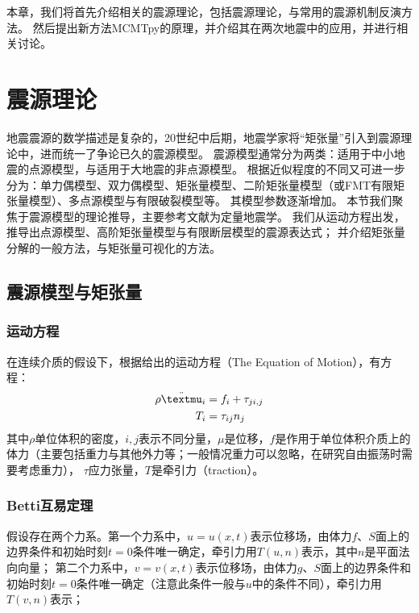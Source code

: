 本章，我们将首先介绍相关的震源理论，包括震源理论，与常用的震源机制反演方法。
然后提出新方法MCMTpy的原理，并介绍其在两次地震中的应用，并进行相关讨论。







\section{震源理论}

地震震源的数学描述是复杂的，20世纪中后期，地震学家将“矩张量”引入到震源理论中，进而统一了争论已久的震源模型。
震源模型通常分为两类：适用于中小地震的点源模型，与适用于大地震的非点源模型。
根据近似程度的不同又可进一步分为：单力偶模型、双力偶模型、矩张量模型、二阶矩张量模型（或FMT有限矩张量模型）、多点源模型与有限破裂模型等。
其模型参数逐渐增加。
本节我们聚焦于震源模型的理论推导，主要参考文献为定量地震学\citep{aki2002quantitative}。
我们从运动方程出发，推导出点源模型、高阶矩张量模型与有限断层模型的震源表达式；
并介绍矩张量分解的一般方法，与矩张量可视化的方法。

\subsection{震源模型与矩张量}

\subsubsection{运动方程}
在连续介质的假设下，根据\citep{aki2002quantitative}给出的运动方程（The Equation of Motion），有方程：
\begin{align}
    \rho {\ddot \mu_i} & = f_i + \tau_{ji,j} \notag \\
    T_i & = \tau_{ij} n_j
    \label{equ:motion-1}
\end{align}
其中$\rho$单位体积的密度，$i,j$表示不同分量，$\mu$是位移，$f$是作用于单位体积介质上的体力（主要包括重力与其他外力等；一般情况重力可以忽略，在研究自由振荡时需要考虑重力），
$\tau$应力张量，$T$是牵引力（traction）。



\subsubsection{Betti互易定理}

假设存在两个力系。第一个力系中，$u=u(x,t)$表示位移场，由体力$f$、$S$面上的边界条件和初始时刻$t=0$条件唯一确定，牵引力用$T(u,n)$表示，其中$n$是平面法向向量；
第二个力系中，$v=v(x,t)$表示位移场，由体力$g$、$S$面上的边界条件和初始时刻$t=0$条件唯一确定（注意此条件一般与$u$中的条件不同），牵引力用$T(v,n)$表示；


